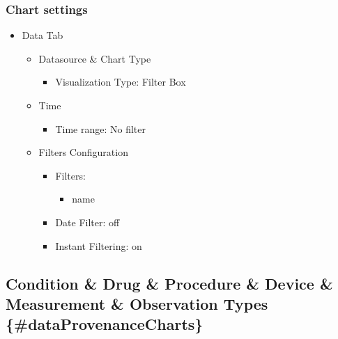 \documentclass[
]{book}
\providecommand{\tightlist}{%
  \setlength{\itemsep}{0pt}\setlength{\parskip}{0pt}}
\begin{document}
\hypertarget{chart-settings-34}{%
\subsubsection*{Chart settings}\label{chart-settings-34}}

\begin{itemize}
\tightlist
\item
  Data Tab

  \begin{itemize}
  \tightlist
  \item
    Datasource \& Chart Type

    \begin{itemize}
    \tightlist
    \item
      Visualization Type: Filter Box
    \end{itemize}
  \item
    Time

    \begin{itemize}
    \tightlist
    \item
      Time range: No filter
    \end{itemize}
  \item
    Filters Configuration

    \begin{itemize}
    \tightlist
    \item
      Filters:

      \begin{itemize}
      \tightlist
      \item
        name
      \end{itemize}
    \item
      Date Filter: off
    \item
      Instant Filtering: on
    \end{itemize}
  \end{itemize}
\end{itemize}

\hypertarget{condition-drug-procedure-device-measurement-observation-types-dataprovenancecharts}{%
\subsection*{Condition \& Drug \& Procedure \& Device \& Measurement \& Observation Types \{\#dataProvenanceCharts\}}\label{condition-drug-procedure-device-measurement-observation-types-dataprovenancecharts}}
\end{document}
